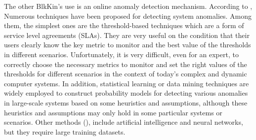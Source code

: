 The other BlkKin's use is an online anomaly detection mechanism. According to
\cite{china-detector}, Numerous techniques have been proposed for detecting
system anomalies. Among them, the simplest ones are the threshold-based
techniques which are a form of service level agreements (SLAs). They are very
useful on the condition that their users clearly know the key metric to monitor
and the best value of the thresholds in different scenarios.  Unfortunately, it
is very difficult, even for an expert, to correctly choose the necessary metrics
to monitor and set the right values of the thresholds for different scenarios in
the context of today's complex and dynamic computer systems. In addition,
statistical learning or data mining techniques are widely employed to construct
probability models for detecting various anomalies in large-scale systems based
on some heuristics and assumptions, although these heuristics and assumptions
may only hold in some particular systems or scenarios. Other methods
(\cite{syslog-svm}), include artificial intelligence and neural networks, but
they require large training datasets.
